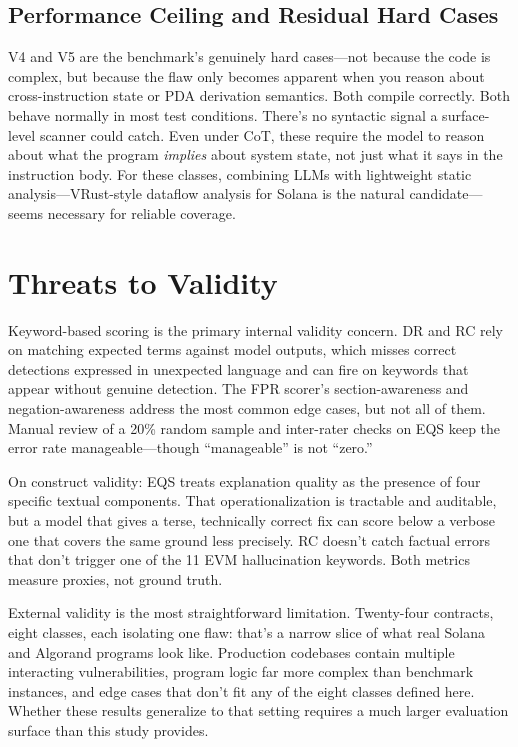 \documentclass[journal]{IEEEtran}
\begin{document}
\subsection{Performance Ceiling and Residual Hard Cases}

V4 and V5 are the benchmark's genuinely hard cases---not because the code
is complex, but because the flaw only becomes apparent when you reason about
cross-instruction state or PDA derivation semantics.
Both compile correctly. Both behave normally in most test conditions.
There's no syntactic signal a surface-level scanner could catch.
Even under CoT, these require the model to reason about what the program
\emph{implies} about system state, not just what it says in the instruction
body.
For these classes, combining LLMs with lightweight static analysis---VRust-style
dataflow analysis for Solana is the natural candidate---seems necessary for
reliable coverage.

\section{Threats to Validity}
\label{sec:threats}

Keyword-based scoring is the primary internal validity concern.
DR and RC rely on matching expected terms against model outputs, which
misses correct detections expressed in unexpected language and can fire
on keywords that appear without genuine detection.
The FPR scorer's section-awareness and negation-awareness address the most
common edge cases, but not all of them.
Manual review of a 20\% random sample and inter-rater checks on EQS keep
the error rate manageable---though ``manageable'' is not ``zero.''

On construct validity: EQS treats explanation quality as the presence of
four specific textual components.
That operationalization is tractable and auditable, but a model that gives
a terse, technically correct fix can score below a verbose one that covers
the same ground less precisely.
RC doesn't catch factual errors that don't trigger one of the 11 EVM
hallucination keywords.
Both metrics measure proxies, not ground truth.

External validity is the most straightforward limitation.
Twenty-four contracts, eight classes, each isolating one flaw: that's a
narrow slice of what real Solana and Algorand programs look like.
Production codebases contain multiple interacting vulnerabilities, program
logic far more complex than benchmark instances, and edge cases that don't
fit any of the eight classes defined here.
Whether these results generalize to that setting requires a much larger
evaluation surface than this study provides.
\end{document}
